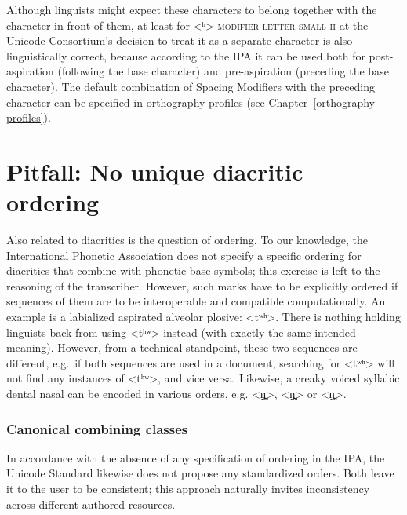 Although linguists might expect these characters to belong together with the
character in front of them, at least for <ʰ> \textsc{modifier letter small h} at
 the Unicode Consortium's decision to treat it as a separate character
is also linguistically correct, because according to the IPA it can be used both
for post-aspiration (following the base character) and pre-aspiration (preceding
the base character). The default combination of Spacing Modifiers with the
preceding character can be specified in orthography profiles (see
Chapter~\ref{orthography-profiles}).

\section{Pitfall: No unique diacritic ordering}
\label{pitfall-no-unique-diacritic-ordering}

Also related to diacritics is the question of ordering. To our knowledge, the
International Phonetic Association does not specify a specific ordering for
diacritics that combine with phonetic base symbols; this exercise is left to the
reasoning of the transcriber. However, such marks have to be explicitly ordered
if sequences of them are to be interoperable and compatible computationally. An example is a
labialized aspirated alveolar plosive: <tʷʰ>. There is nothing holding linguists
back from using <tʰʷ> instead (with exactly the same intended meaning). However,
from a technical standpoint, these two sequences are different, e.g.~if both
sequences are used in a document, searching for <tʷʰ> will not find any
instances of <tʰʷ>, and vice versa. Likewise, a creaky voiced syllabic dental
nasal can be encoded in various orders, e.g. <n̪̰̩>, <n̩̰̪> or <n̩̪̰>.

\subsubsection*{Canonical combining classes}

In accordance with the absence of any specification of ordering in the IPA, the
Unicode Standard likewise does not propose any standardized orders. Both leave it
to the user to be consistent; this approach naturally invites inconsistency across 
different authored resources.

